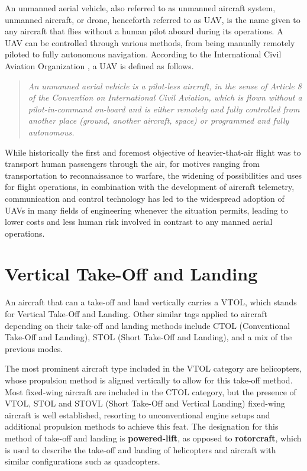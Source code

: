 \documentclass[english,fira]{ist-report}
\begin{document}
An unmanned aerial vehicle, also referred to as unmanned aircraft system, unmanned aircraft, or drone, henceforth referred to as UAV, is the name given to any aircraft that flies without a human pilot aboard during its operations. A UAV can be controlled through various methods, from being manually remotely piloted\footnotemark{} to fully autonomous navigation. According to the International Civil Aviation Organization \cite{icao_uav}, a UAV is defined as follows.
\begin{quotation} \itshape
    An unmanned aerial vehicle is a pilot-less aircraft, in the sense of Article 8 of the Convention on International Civil Aviation, which is flown without a pilot-in-command on-board and is either remotely and fully controlled from another place (ground, another aircraft, space) or programmed and fully autonomous.
\end{quotation}
While historically the first and foremost objective of heavier-that-air flight was to transport human passengers through the air, for motives ranging from transportation to reconnaissance to warfare, the widening of possibilities and uses for flight operations, in combination with the development of aircraft telemetry, communication and control technology has led to the widespread adoption of UAVs in many fields of engineering whenever the situation permits, leading to lower costs and less human risk involved in contrast to any manned aerial operations.

\section{Vertical Take-Off and Landing}

An aircraft that can a take-off and land vertically carries a VTOL, which stands for Vertical Take-Off and Landing. Other similar tags applied to aircraft depending on their take-off and landing methods include CTOL (Conventional Take-Off and Landing), STOL (Short Take-Off and Landing), and a mix of the previous modes.

The most prominent aircraft type included in the VTOL category are helicopters, whose propulsion method is aligned vertically to allow for this take-off method. Most fixed-wing aircraft are included in the CTOL category, but the presence of VTOL, STOL and STOVL (Short Take-Off and Vertical Landing) fixed-wing aircraft is well established, resorting to unconventional engine setups and additional propulsion methods to achieve this feat. The designation for this method of take-off and landing is \textbf{powered-lift}, as opposed to \textbf{rotorcraft}, which is used to describe the take-off and landing of helicopters and aircraft with similar configurations such as quadcopters.
\end{document}

